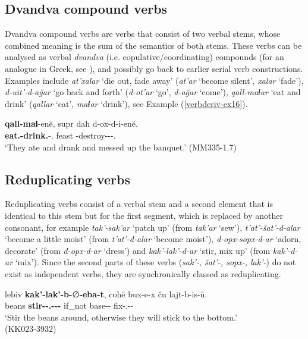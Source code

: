 \subsection{Dvandva compound verbs}

Dvandva compound verbs are verbs that consist of two verbal stems, whose combined meaning is the sum of the semantics of both stems. These verbs can be analysed as verbal \textit{dvandva} (i.e. copulative/coordinating) compounds (for an analogue in Greek, see \cite{nicholasjosephgreek}), and possibly go back to earlier serial verb constructions. Examples include \textit{at'xalar} `die out, fade away' (\textit{at'ar} `become silent', \textit{xalar} `fade'), \textit{d-uit'-d-a\u{g}ar} `go back and forth' (\textit{d-ot'ar} `go', \textit{d-a\u{g}ar} `come'), \textit{qall-maɬar} `eat and drink' (\textit{qallar} `eat', \textit{maɬar} `drink'), see Example (\ref{verbderiv-ex16}).


	\begin{exe}
		\ex\label{verbderiv-ex16}
		\gll  \textbf{qall-maɬ}-en\u{e}, supr daħ d-ox-d-i-en\u{e}. \\
		\textbf{eat.{\Pfv}-drink.{\Pfv}}-{\Aor}.{\Seq} feast {\Pv} {\D}-destroy-{\D}-{\Tr}-{\Aor}.{\Seq} \\
		\trans `They ate and drank and messed up the banquet.'
		\hfill (MM335-1.7)
	\end{exe}



\subsection{Reduplicating verbs}

Reduplicating verbs consist of a verbal stem and a second element that is identical to this stem but for the first segment, which is replaced by another consonant, for example \textit{tak'-sak'ar} `patch up' (from \textit{tak'ar} `sew'), \textit{t'at'-šat'-d-alar} `become a little moist' (from \textit{t'at'-d-alar} `become moist'), \textit{d-opx-sopx-d-ar} `adorn, decorate' (from \textit{d-opx-d-ar} `dress') and \textit{kak'-lak'-d-ar} `stir, mix up' (from \textit{kak'-d-ar} `mix'). Since the second parts of these verbs (\textit{sak'-, šat'-, sopx-, lak'-}) do not exist as independent verbs, they are synchronically classed as reduplicating.


	\begin{exe}
		\ex\label{verbderiv-ex17}
		\gll lebiv \textbf{kak'-lak'-b-}∅\textbf{-eba-t}, coħ\u{e} bux-e-x ču lajt-b-is-\u{u}. \\
		beans \textbf{stir-{\Redupl}-{\B}.{\Sg}-{\Tr}-{\Imp}-{\Pl}} if\_not base-{\Obl}-{\Cont} {\Pv} fix-{\B}.{\Sg}-{\Lv}-{\Npst}\\
		\trans `Stir the beans around, otherwise they will stick to the bottom.' \\
		\hfill (KK023-3932)
	\end{exe}



